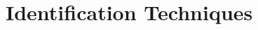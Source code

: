     \section{Identification Techniques}

    \begin{comment}
        Knowing the state space model of our system we tried 3 different approaches in order to find our system's physical parameters:
        
        \subsection{Deprecated Methods}
            \subsubsection{Stiffness identification}
                    
                The first method sticks too much on the reliability of the parameters from the data sheet: we tried to identify just the value of the stiffness of the spring using a step signal and analyzing the frequency of the peak of resonance:
                \[
                    K_s = J_L \cdot \omega_n^2\]
                As result our model didn't fit a lot the real system and the results was so bad that encourage us to proceed in a complete different direction.

            \subsubsection{Identification Toolbox}

                Due to high number of possible uncertainties we look for a different approach that could work around the small number of possible types of experiments and the direct inaccessibility of some parameters. An interesting example of this last consideration is the impossible measurement of the current inside the armature to get a measurement of the resistance $R_m$.

                For these reasons we choose to look for an optimization method that can provide the values of the state space matrices. The first attempt consisted in the usage of the model identification toolbox that, given the order of the system, provides a transfer function representation of the system. 
                
                I will not go in deep with this method became as first step in that direction we didn't put too much effort. In fact, we let Matlab works on its own to get the model however the results weren't good enough and in this way we lost the physical meaning of the provided quantities.
    \end{comment}
